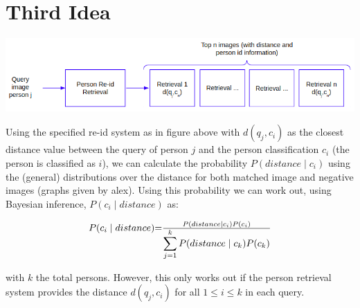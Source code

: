 \documentclass[10pt,a4paper,final]{article}
\begin{document}
\section{Third Idea}

\includegraphics[width=\textwidth]{figures/third_idea.png}

Using the specified re-id system as in figure above with $d(q_j, c_i)$ as the closest distance value between the query of person $j$ and the person classification $c_i$ (the person is classified as $i$), we can calculate the probability $P(distance \mid c_i)$ using the (general) distributions over the distance for both matched image and negative images (graphs given by alex). Using this probability we can work out, using Bayesian inference, $P(c_i \mid distance)$ as:

\begin{equation}
	\label{eq:third_idea}
	\begin{tabular}{r@{=}l}
		$P(c_i \mid distance)$ & $\frac{P(distance \mid c_i) P(c_i)}{\displaystyle\sum_{j=1}^{k} P(distance \mid c_k) P(c_k)}$ \\ 
	\end{tabular}
\end{equation}

\noindent with $k$ the total persons. However, this only works out if the person retrieval system provides the distance $d(q_j, c_i)$ for all $1 \leq i \leq k$ in each query.
\end{document}
